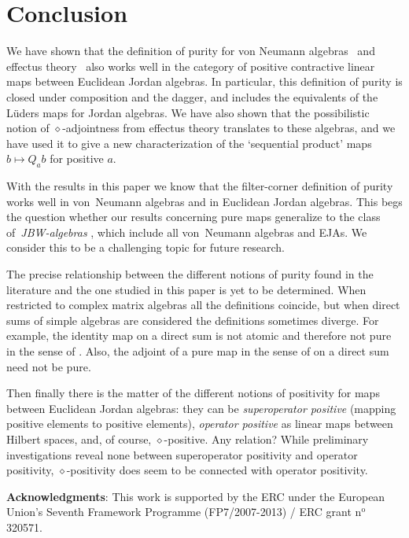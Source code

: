 \documentclass[submission,copyright,creativecommons]{eptcs}
\theoremstyle{definition}
\begin{document}
\section{Conclusion}
We have shown that the definition of purity for von Neumann algebras~\cite{bramthesis,westerbaan2016paschke,westerbaan2016universal} and effectus theory~\cite{cho2015introduction,cho2015quotient} also works well in the category of positive contractive linear maps between Euclidean Jordan algebras. In particular, this definition of purity is closed under composition and the dagger, and includes the equivalents of the L\"uders maps for Jordan algebras. We have also shown that the possibilistic notion of $\diamond$-adjointness from effectus theory translates to these algebras, and we have used it to give a new characterization of the `sequential product' maps $b\mapsto Q_ab$ for positive $a$.

With the results in this paper we know that the filter-corner definition of purity works well in von~Neumann algebras and in Euclidean Jordan algebras. 
This begs the question whether our results concerning pure maps generalize
to the class of~\emph{JBW-algebras} \cite{hanche1984jordan},
which include all von~Neumann algebras and EJAs.
We consider this to be a challenging topic for future research.

The precise relationship between the different notions of purity found in the literature and the one studied in this paper is yet to be determined. When restricted to complex matrix algebras all the definitions coincide, but when direct sums of simple algebras are considered the definitions sometimes diverge. For example, the identity map on a direct sum is not atomic and therefore not pure in the sense of \cite{chiribella2011informational}. Also, the adjoint of a pure map in the sense of \cite{cunningham2017purity,selby2018reconstructing} on a direct sum need not be pure.

Then finally there is the matter of the different notions of positivity for
maps between Euclidean Jordan algebras: they can be
\emph{superoperator positive} (mapping positive elements to positive elements),
\emph{operator positive} as linear maps between Hilbert spaces,
and, of course, $\diamond$-positive. 
Any relation? 
While preliminary investigations reveal
none between superoperator positivity 
and operator positivity, 
$\diamond$-positivity does seem to be connected with operator positivity.

\textbf{Acknowledgments}: This work is supported by the ERC under
the European Union's Seventh Framework Programme (FP7/2007-2013) /
ERC grant n$^\text{o}$ 320571.
\end{document}
